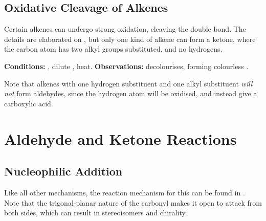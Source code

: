 

		\pagebreak
		\subsection{Oxidative Cleavage of Alkenes}

			Certain alkenes can undergo strong oxidation, cleaving the double bond. The details are elaborated on
			\hyperlink{OxidativeCleavageOfAlkenes}{}, but only one kind of alkene can form a ketone, where the carbon
			atom has two alkyl groups substituted, and no hydrogens.

			\vspace{1.5em}
			\vbox{\textbf{Conditions:}	\tabto{35mm}, dilute , heat.}
			\vbox{\textbf{Observations:}  decolourises, forming colourless .}



			Note that alkenes with one hydrogen substituent and one alkyl substituent \textit{will not} form aldehydes, since the hydrogen
			atom will be oxidised, and instead give a carboxylic acid.



	\pagebreak
	\section{Aldehyde and Ketone Reactions}

		\subsection{Nucleophilic Addition}

			Like all other mechanisms, the reaction mechanism for this can be found in
			\hyperlink{AppendixNucleophilicAddition}{}. Note that the trigonal-planar nature of the carbonyl makes it
			open to attack from both sides, which can result in stereoisomers and chirality.



